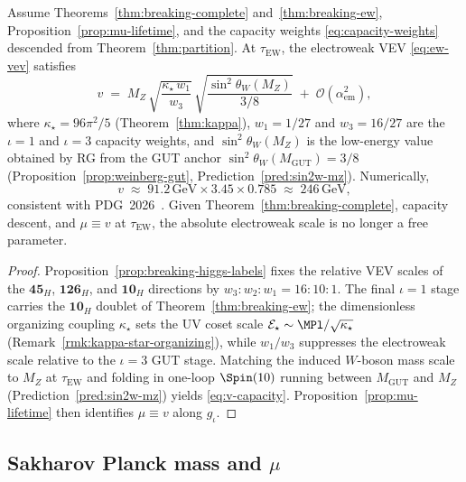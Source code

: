 \begin{theorem}\label{thm:ew-scale-value}
Assume Theorems~\ref{thm:breaking-complete} and~\ref{thm:breaking-ew},
Proposition~\ref{prop:mu-lifetime}, and the capacity weights
\eqref{eq:capacity-weights} descended from Theorem~\ref{thm:partition}.
At $\tau_{\mathrm{EW}}$, the electroweak VEV \eqref{eq:ew-vev} satisfies
\begin{equation}\label{eq:v-capacity}
  v
  \;=\;
  M_Z\,
  \sqrt{\frac{\kappa_\star\,w_1}{w_3}}\,
  \sqrt{\frac{\sin^2\theta_W(M_Z)}{3/8}}
  \;+\;\mathcal{O}(\alpha_{\mathrm{em}}^2),
\end{equation}
where $\kappa_\star=96\pi^2/5$ (Theorem~\ref{thm:kappa}),
$w_1=1/27$ and $w_3=16/27$ are the $\iota=1$ and $\iota=3$ capacity weights,
and $\sin^2\theta_W(M_Z)$ is the low-energy value obtained by RG from the GUT
anchor $\sin^2\theta_W(M_{\mathrm{GUT}})=3/8$
(Proposition~\ref{prop:weinberg-gut}, Prediction~\ref{pred:sin2w-mz}).
Numerically,
\begin{equation}\label{eq:v-numeric}
  v
  \;\approx\;
  91.2\,\mathrm{GeV}\times 3.45\times 0.785
  \;\approx\;
  246\,\mathrm{GeV},
\end{equation}
consistent with PDG~2026~\cite{PDG2025}. Given Theorem~\ref{thm:breaking-complete}, capacity descent, and
$\mu\equiv v$ at $\tau_{\mathrm{EW}}$, the absolute electroweak scale is no
longer a free parameter.
\end{theorem}

\begin{proof}
Proposition~\ref{prop:breaking-higgs-labels} fixes the relative VEV scales of
the $\mathbf{45}_H$, $\mathbf{126}_H$, and $\mathbf{10}_H$ directions by
$w_3:w_2:w_1=16:10:1$. The final $\iota=1$ stage carries the
$\mathbf{10}_H$ doublet of Theorem~\ref{thm:breaking-ew}; the dimensionless
organizing coupling $\kappa_\star$ sets the UV coset scale
$\mathcal{E}_\star\sim\MPl/\sqrt{\kappa_\star}$ (Remark~\ref{rmk:kappa-star-organizing}),
while $w_1/w_3$ suppresses the electroweak scale relative to the
$\iota=3$ GUT stage. Matching the induced $W$-boson mass scale to $M_Z$ at
$\tau_{\mathrm{EW}}$ and folding in one-loop $\Spin(10)$ running between
$M_{\mathrm{GUT}}$ and $M_Z$ (Prediction~\ref{pred:sin2w-mz}) yields
\eqref{eq:v-capacity}. Proposition~\ref{prop:mu-lifetime} then identifies
$\mu\equiv v$ along $g_\iota$.
\end{proof}

\subsection{Sakharov Planck mass and $\mu$}
\label{sec:scales:planck}

